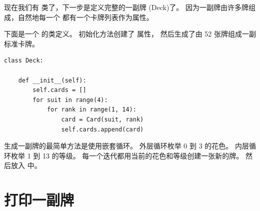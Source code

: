 

现在我们有  类了，下一步是定义完整的一副牌 (Deck)了。
因为一副牌由许多牌组成，自然地每一个  都有一个卡牌列表作为属性。



下面是一个  的类定义。
初始化方法创建了  属性， 然后生成了由 52 张牌组成一副标准卡牌。

  
  

\begin{lstlisting}
class Deck:

    def __init__(self):
        self.cards = []
        for suit in range(4):
            for rank in range(1, 14):
                card = Card(suit, rank)
                self.cards.append(card)
\end{lstlisting}


生成一副牌的最简单方法是使用嵌套循环。
外层循环枚举 0 到 3 的花色。
内层循环枚举 1 到 13 的等级。
每一个迭代都用当前的花色和等级创建一张新的牌。
然后放入  中。



\section{打印一副牌}

\label{printdeck}

